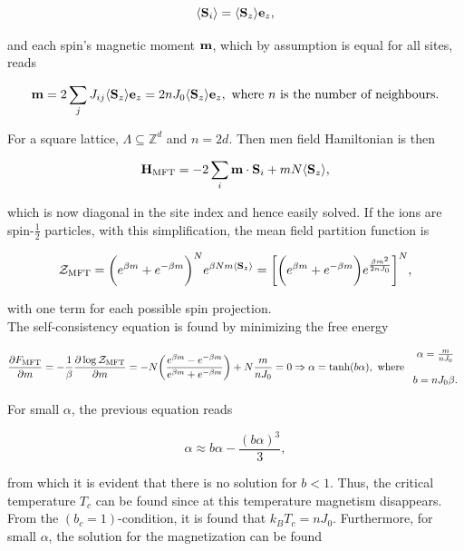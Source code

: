\documentclass{homework}
\begin{document}
$$
    \langle {\bf S}_i \rangle = \langle {\bf S}_z \rangle {\bf e}_z,
$$

and each spin's magnetic moment ${\bf m}$, which by assumption is equal for all sites, reads

$$
    {\bf m} = 2 \sum_{j} J_{ij} \langle {\bf S}_z \rangle {\bf e}_z = 2n J_0 \langle {\bf S}_z \rangle {\bf e}_z, \textnormal{ where $n$ is the number of neighbours}. 
$$

For a square lattice, $\Lambda \subseteq \mathds{Z}^d$ and $n = 2d$. Then men field Hamiltonian is then

$$
    {\bf H}_{\textnormal{MFT}} = - 2 \sum_{i} {\bf m} \cdot {\bf S}_i + m N \langle {\bf S}_z \rangle,
$$

which is now diagonal in the site index and hence easily solved. If the ions are spin-$\frac{1}{2}$ particles, with this simplification, the mean field partition function is 

$$
    {\mathcal{Z}_{\textnormal{MFT}}} = \bigg( e^{\beta m} + e^{-\beta m} \bigg)^N e^{\beta N m \langle {\bf S}_z \rangle} = \bigg[ \bigg( e^{\beta m} + e^{-\beta m} \bigg) e^{\frac{\beta m^2}{2n J_0}} \bigg]^N,
$$

with one term for each possible spin projection. \\

The self-consistency equation is found by minimizing the free energy 

$$
    \frac{\partial F_{\textnormal{MFT}}}{\partial m} = - \frac{1}{\beta} \frac{\partial \log  {\mathcal{Z}_{\textnormal{MFT}}}}{\partial m} = -N \bigg(\frac{e^{\beta m} - e^{-\beta m}}{e^{\beta m} + e^{-\beta m}}\bigg) + N \frac{m}{n J_0} = 0 \Rightarrow \alpha = \tanh(b \alpha), \textnormal{ where } \begin{array}{c}
        \alpha = \frac{m}{nJ_0}  \\
        \\
        b = nJ_0 \beta.  
    \end{array}
$$

For small $\alpha$, the previous equation reads

$$
\alpha \approx b \alpha - \frac{(b\alpha)^3}{3},
$$

from which it is evident that there is no solution for $b < 1$. Thus, the critical temperature $T_c$ can be found since at this temperature magnetism disappears. From the $(b_c = 1)$-condition, it is found that $k_B T_c = n J_0$. Furthermore, for small $\alpha$, the solution for the magnetization can be found 
\end{document}
